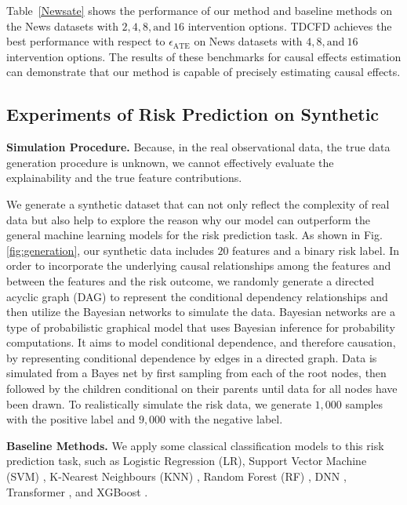 \documentclass[letterpaper]{article} %
\theoremstyle{definition}
\theoremstyle{remark}
\begin{document}
Table~\ref{Newsate} shows the performance of our method and baseline methods on the News datasets with $2, 4, 8, \text{and} \ 16$ intervention options. TDCFD achieves the best performance with respect to $\epsilon_\text{ATE}$ on News datasets with $4, 8, \text{and} \ 16$ intervention options. The results of these benchmarks for causal effects estimation can demonstrate that our method is capable of precisely estimating causal effects.


\subsection{Experiments of Risk Prediction on Synthetic}




\noindent\textbf{Simulation Procedure.}
Because, in the real observational data, the true data generation procedure is unknown, we cannot effectively evaluate the explainability and the true feature contributions.

We generate a synthetic dataset that can not only reflect the complexity of real data but also help to explore the reason why our model can outperform the general machine learning models for the risk prediction task. As shown in Fig. \ref{fig:generation}, our synthetic data includes $20$ features and a binary risk label. In order to incorporate the underlying causal relationships among the features and between the features and the risk outcome, we randomly generate a directed acyclic graph (DAG) to represent the conditional dependency relationships and then utilize the Bayesian networks \cite{heckerman2008tutorial} to simulate the data. Bayesian networks are a type of probabilistic graphical model that uses Bayesian inference for probability computations. It aims to model conditional dependence, and therefore causation, by representing conditional dependence by edges in a directed graph. Data is simulated from a Bayes net by first sampling from each of the root nodes, then followed by the children conditional on their parents until data for all nodes have been drawn. To realistically simulate the risk data, we generate $1,000$ samples with the positive label and $9,000$ with the negative label.


\noindent\textbf{Baseline Methods.} We apply some classical classification models to this risk prediction task, such as Logistic Regression (LR), Support Vector Machine (SVM) \cite{suykens1999least}, K-Nearest Neighbours (KNN) \cite{cunningham2021k}, Random Forest (RF) \cite{breiman2001random}, DNN \cite{larochelle2009exploring}, Transformer \cite{vaswani2017attention}, and XGBoost \cite{chen2016xgboost}.
\end{document}
